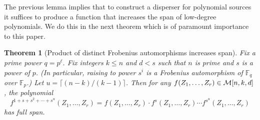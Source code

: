 \documentclass[10pt]{article}
\newtheorem{theorem}{Theorem}[section]
\theoremstyle{definition}
\numberwithin{equation}{section}
\newcommand{\F}{\mathbb F_q}
\newcommand{\M}[3]{{\cal M}[#1,#2,#3]}
\begin{document}
%
%
%
%
%
%
The previous lemma implies that to construct a disperser for
polynomial sources it suffices to produce a function that increases
the span of low-degree polynomials.  We do this in the next
theorem which is of paramount importance to this paper.
%
\begin{theorem}[Product of distinct Frobenius automorphisms increases span]\label{thm-spanning_poly}
Fix a prime power $q=p^{\ell}$. Fix integers $k\leq n$ and $d<s$ such that $n$ is prime
and $s$ is a power of $p$. (In particular, raising to power $s^i$ is a Frobenius automorphism of $\F$ over $\mathbb{F}_p$.)
Let $u= \lceil (n-k)/(k-1)\rceil $.
Then for any $f(Z_1,\ldots,Z_r)\in \M{n}{k}{d}$, the polynomial
\[f^{1+s+s^2+\cdots +  s^u}(Z_1,\ldots,Z_r)=f(Z_1,\ldots,Z_r)\cdot f^s(Z_1,\ldots,Z_r)\cdots f^{s^u}(Z_1,\ldots,Z_r)\] has full span.
%
%
%
\end{theorem}
\end{document}

